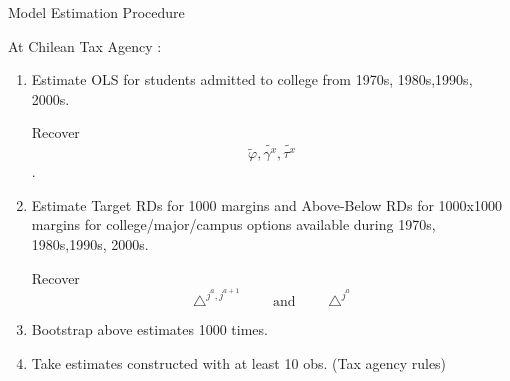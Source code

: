 \documentclass[table,10pt]{beamer}
\begin{document}
\begin{frame}{Model Estimation Procedure}

 At Chilean Tax Agency :
\begin{enumerate}

  \item<1> Estimate OLS for students admitted to college from 1970s, 1980s,1990s, 2000s.
  \medskip

  Recover $$\tilde{\varphi},\tilde{\gamma^x},\tilde{\tau^x}$$.


  \item<2> Estimate Target RDs for 1000 margins and Above-Below RDs for 1000x1000  margins for   college/major/campus options available during 1970s, 1980s,1990s, 2000s.
  \medskip

  Recover $$\triangle^{j^{a},j^{a+1}} \qquad\text{ and }\qquad \triangle^{j^{a}}$$


  \item<3> Bootstrap above estimates 1000 times.
  \medskip

  \item<4> Take estimates constructed with at least 10 obs. (Tax agency rules)
\end{enumerate}

\end{frame}
\end{document}
